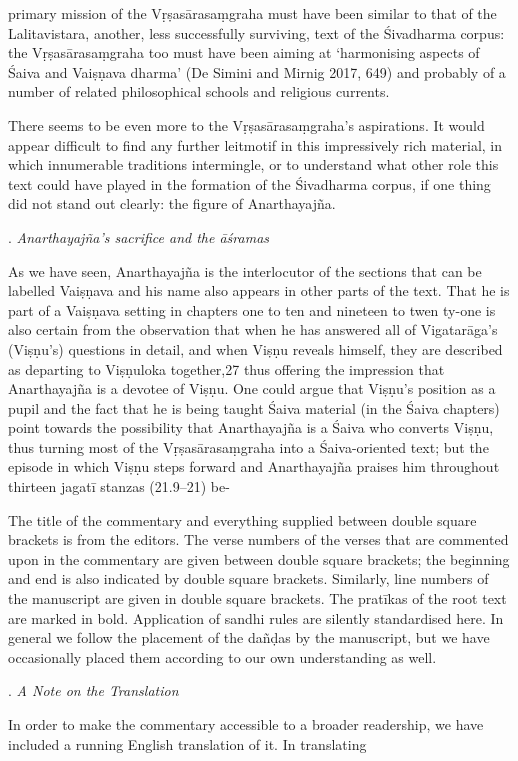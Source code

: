 

\noindent
primary mission of the Vṛṣasārasaṃgraha must have been similar to that of
the Lalitavistara, another, less successfully surviving, text of the Śivadhar\-ma 
corpus: the Vṛṣasārasaṃgraha too must have been aiming at ‘harmo\-nising aspects of Śaiva and Vaiṣṇava dharma’ (De Simini and Mirnig 2017,
649) and probably of a number of related philosophical schools and reli\-gious currents.

There seems to be even more to the Vṛṣasārasaṃgraha’s aspirations. It
would appear difficult to find any further leitmotif in this impressively rich
material, in which innumerable traditions intermingle, or to understand
what other role this text could have played in the formation of the Śivadha\-rma corpus, if one thing did not stand out clearly: the figure of Anarthayajña.

\vspace{1em}
. \textit{Anarthayajña’s sacrifice and the āśramas}
\vspace{.3em}

\noindent
As we have seen, Anarthayajña is the interlocutor of the sections that can be
labelled Vaiṣṇava and his name also appears in other parts of the text. That
he is part of a Vaiṣṇava setting in chapters one to ten and nineteen to twen­
ty-one is also certain from the observation that when he has answered all of
Vigatarāga’s (Viṣṇu’s) questions in detail, and when Viṣṇu reveals himself,
they are described as departing to Viṣṇuloka together,27 thus offering the
impression that Anarthayajña is a devotee of Viṣṇu. One could argue that
Viṣṇu’s position as a pupil and the fact that he is being taught Śaiva material
(in the Śaiva chapters) point towards the possibility that Anarthayajña is
a Śaiva who converts Viṣṇu, thus turning most of the Vṛṣasārasaṃgraha
into a Śaiva-oriented text; but the episode in which Viṣṇu steps forward and
Anarthayajña praises him throughout thirteen jagatī stanzas (21.9–21) be-

The title of the commentary and everything supplied between
double square brackets is from the editors. The verse numbers of
the verses that are commented upon in the commentary are given
between double square brackets; the beginning and end is also
indicated by double square brackets. Similarly, line numbers of the
manuscript are given in double square brackets. The pratīkas of the
root text are marked in bold. Application of sandhi rules are silently
standardised here. In general we follow the placement of the dañḍas
by the manuscript, but we have occasionally placed them according
to our own understanding as well.

\vspace{1em}
. \textit{A Note on the Translation}

\vspace{.3em}
\noindent
In order to make the commentary accessible to a broader readership,
we have included a running English translation of it. In translating



\vfill
\pagebreak
